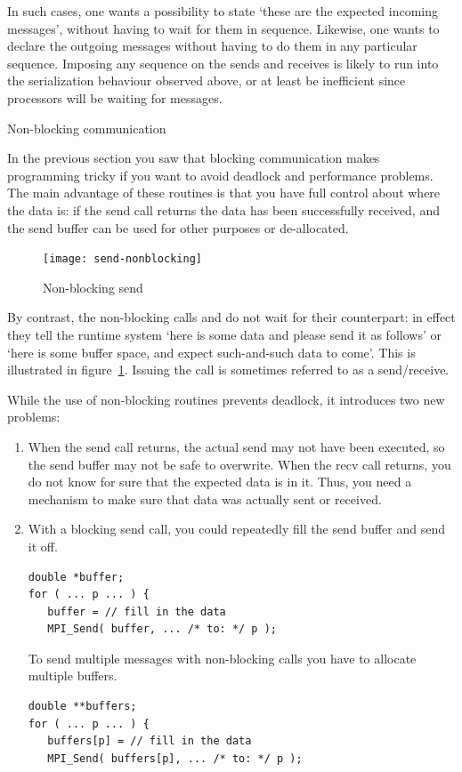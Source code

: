 In such cases, one wants a possibility to state `these are the expected incoming
messages', without having to wait for them in sequence. Likewise, one wants to declare
the outgoing messages without having to do them in any particular sequence.
Imposing any sequence on the sends and receives is likely to run into the serialization
behaviour observed above, or at least be inefficient since processors will be
waiting for messages.

 {Non-blocking communication}
\label{sec:nonblocking}

In the previous section you saw that blocking communication makes
programming tricky if you want to avoid deadlock and performance
problems. The main advantage of these routines is that you have full
control about where the data is: if the send call returns
the data has been successfully received, and the send buffer can be used for
other purposes or de-allocated.  

\begin{figure}[ht]
  \texttt{[image: send-nonblocking]}
  \caption{Non-blocking send}
  \label{fig:send-nonblocking}
\end{figure}

By contrast, the non-blocking calls  and
 do not wait for their counterpart: in effect
they tell the runtime system `here is some data and please send it as
follows' or `here is some buffer space, and expect such-and-such data
to come'.  This is illustrated in figure~\ref{fig:send-nonblocking}.
Issuing the  call is sometimes referred to as
 a send/receive.




While the use of non-blocking routines prevents deadlock, it
introduces two new problems:
\begin{enumerate}
\item When the send call returns, the actual send may not have been executed,
  so the send buffer may not be safe to
  overwrite. When the recv call returns, you do not know for sure that
  the expected data is in it. Thus, you need a mechanism to make sure
  that data was actually sent or received.
\item With a blocking send call, you could repeatedly fill the send
  buffer and send it off.
\begin{lstlisting}
double *buffer;
for ( ... p ... ) {
   buffer = // fill in the data
   MPI_Send( buffer, ... /* to: */ p );
\end{lstlisting}
  To send multiple messages with non-blocking calls
  you have to allocate multiple buffers.
\begin{lstlisting}
double **buffers;
for ( ... p ... ) {
   buffers[p] = // fill in the data
   MPI_Send( buffers[p], ... /* to: */ p );
\end{lstlisting}
\end{enumerate}

